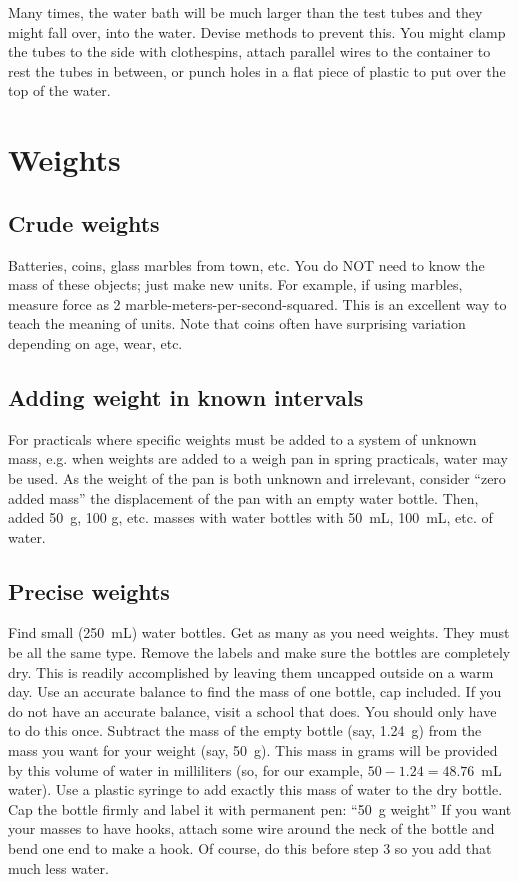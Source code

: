 Many times, 
the water bath will be much larger than the test tubes 
and they might fall over, 
into the water. 
Devise methods to prevent this. 
You might clamp the tubes to the side with clothespins, 
attach parallel wires to the container to rest the tubes in between, 
or punch holes in a flat piece of plastic to put over the top of the water.

\section{Weights}

\subsection{Crude weights}
Batteries, 
coins, 
glass marbles from town, 
etc. 
You do NOT need to know the mass of these objects; just make new units. 
For example, 
if using marbles, 
measure force as 2 marble-meters-per-second-squared. 
This is an excellent way to teach the meaning of units. 
Note that coins often have surprising variation depending on age, 
wear, 
etc.

\subsection{Adding weight in known intervals}
For practicals where specific weights must be added 
to a system of unknown mass, 
e.g. 
when weights are added to a weigh pan in spring practicals, 
water may be used. 
As the weight of the pan is both unknown and irrelevant, 
consider ``zero added mass'' the displacement of the pan with an empty water bottle. 
Then, 
added 50~g, 
100 g, 
etc. masses with water bottles with 50~mL, 
100~mL, 
etc. of water.

\subsection{Precise weights}
Find small (250~mL) water bottles. 
Get as many as you need weights. 
They must be all the same type.
Remove the labels and make sure the bottles are completely dry. 
This is readily accomplished 
by leaving them uncapped outside on a warm day.
Use an accurate balance to find the mass of one bottle, 
cap included. 
If you do not have an accurate balance, 
visit a school that does. 
You should only have to do this once.
Subtract the mass of the empty bottle (say, 
1.24~g) from the mass you want for your weight (say, 
50~g). 
This mass in grams will be provided 
by this volume of water in milliliters (so, 
for our example, 
$ 50 - 1.24 = 48.76 $~mL water). 
Use a plastic syringe to add exactly this mass of water to the dry bottle.
Cap the bottle firmly and label it with permanent pen: ``50~g weight'' 
If you want your masses to have hooks, 
attach some wire around the neck of the bottle 
and bend one end to make a hook. 
Of course, 
do this before step 3 so you add that much less water.

